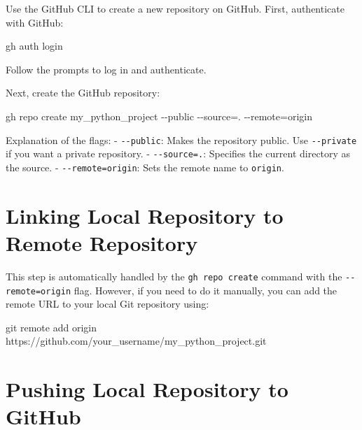 \documentclass[
  letterpaper,
  DIV=11,
  numbers=noendperiod]{scrreprt}
\newenvironment{Shaded}{\begin{snugshade}}{\end{snugshade}}
\newcommand{\AttributeTok}[1]{\textcolor[rgb]{0.40,0.45,0.13}{#1}}
\newcommand{\ExtensionTok}[1]{\textcolor[rgb]{0.00,0.23,0.31}{#1}}
\newcommand{\FunctionTok}[1]{\textcolor[rgb]{0.28,0.35,0.67}{#1}}
\newcommand{\NormalTok}[1]{\textcolor[rgb]{0.00,0.23,0.31}{#1}}
\newcommand{\OperatorTok}[1]{\textcolor[rgb]{0.37,0.37,0.37}{#1}}
\begin{document}
Use the GitHub CLI to create a new repository on GitHub. First,
authenticate with GitHub:

\begin{Shaded}
\begin{Highlighting}[]
\ExtensionTok{gh}\NormalTok{ auth login}
\end{Highlighting}
\end{Shaded}

Follow the prompts to log in and authenticate.

Next, create the GitHub repository:

\begin{Shaded}
\begin{Highlighting}[]
\ExtensionTok{gh}\NormalTok{ repo create my\_python\_project }\AttributeTok{{-}{-}public} \AttributeTok{{-}{-}source}\OperatorTok{=}\NormalTok{. }\AttributeTok{{-}{-}remote}\OperatorTok{=}\NormalTok{origin}
\end{Highlighting}
\end{Shaded}

Explanation of the flags: - \texttt{-\/-public}: Makes the repository
public. Use \texttt{-\/-private} if you want a private repository. -
\texttt{-\/-source=.}: Specifies the current directory as the source. -
\texttt{-\/-remote=origin}: Sets the remote name to \texttt{origin}.

\section{Linking Local Repository to Remote
Repository}\label{linking-local-repository-to-remote-repository}

This step is automatically handled by the \texttt{gh\ repo\ create}
command with the \texttt{-\/-remote=origin} flag. However, if you need
to do it manually, you can add the remote URL to your local Git
repository using:

\begin{Shaded}
\begin{Highlighting}[]
\FunctionTok{git}\NormalTok{ remote add origin https://github.com/your\_username/my\_python\_project.git}
\end{Highlighting}
\end{Shaded}

\section{Pushing Local Repository to
GitHub}\label{pushing-local-repository-to-github}
\end{document}
